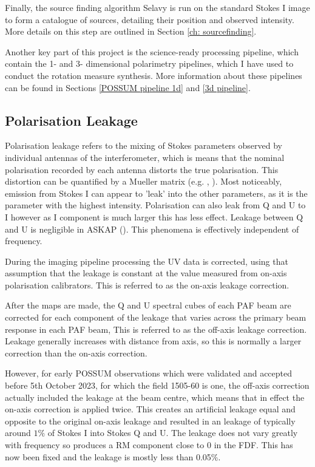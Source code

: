 Finally, the source finding algorithm Selavy is run on the standard Stokes I image to form a catalogue of sources, detailing their position and observed intensity. More details on this step are outlined in Section \ref{ch: sourcefinding}.

Another key part of this project is the science-ready processing pipeline, which contain the 1- and 3- dimensional polarimetry pipelines, which I have used to conduct the rotation measure synthesis. More information about these pipelines can be found in Sections \ref{POSSUM pipeline 1d} and \ref{3d pipeline}.

\subsection{Polarisation Leakage}

Polarisation leakage refers to the mixing of Stokes parameters observed by individual antennas of the interferometer, which is means that the nominal polarisation recorded by each antenna distorts the true polarisation. This distortion can be quantified by a Mueller matrix (e.g. \cite{2009_mueller}, \cite{gil2022polarized}). Most noticeably, emission from Stokes I can appear to 'leak' into the other parameters, as it is the parameter with the highest intensity. Polarisation can also leak from Q and U to I however as I component is much larger this has less effect. Leakage between Q and U is negligible in ASKAP (\cite{sault2015aces}). This phenomena is effectively independent of frequency.

During the imaging pipeline processing the UV data is corrected, using that assumption that the leakage is constant at the value measured from on-axis polarisation calibrators. This is referred to as the on-axis leakage correction. 

After the maps are made, the Q and U spectral cubes of each PAF beam are corrected for each component of the leakage that varies across the primary beam response in each PAF beam, This is referred to as the off-axis leakage correction. Leakage generally increases with distance from axis, so this is normally a larger correction than the on-axis correction. 

However, for early POSSUM observations which were validated and accepted before 5th October 2023, for which the field 1505-60 is one, the off-axis correction actually included the leakage at the beam centre, which means that in effect the on-axis correction is applied twice. This creates an artificial leakage equal and opposite to the original on-axis leakage and resulted in an leakage of typically around $1\%$ of Stokes I into Stokes Q and U. The leakage does not vary greatly with frequency so produces a RM component close to 0 in the FDF. This has now been fixed and the leakage is mostly less than 0.05$\%$.

